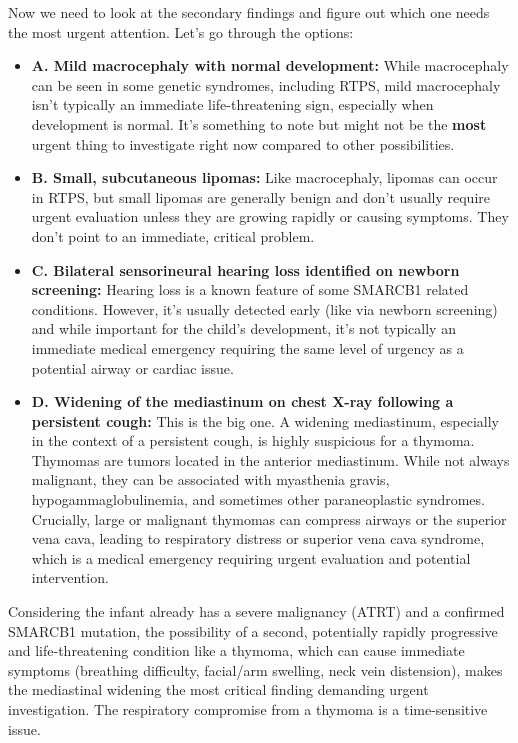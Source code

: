 \documentclass{article}
\theoremstyle{plain}
\theoremstyle{definition}
\theoremstyle{remark}
\begin{document}
\begin{tcolorbox}
\begin{tcolorbox}
        Now we need to look at the secondary findings and figure out which one needs the most urgent attention. Let's go through the options:

        \begin{itemize}[leftmargin=*, nosep]
            \item \textbf{A. Mild macrocephaly with normal development:} While macrocephaly can be seen in some genetic syndromes, including RTPS, mild macrocephaly isn't typically an immediate life-threatening sign, especially when development is normal. It's something to note but might not be the \textbf{most} urgent thing to investigate right now compared to other possibilities.
            \item \textbf{B. Small, subcutaneous lipomas:} Like macrocephaly, lipomas can occur in RTPS, but small lipomas are generally benign and don't usually require urgent evaluation unless they are growing rapidly or causing symptoms. They don't point to an immediate, critical problem.
            \item \textbf{C. Bilateral sensorineural hearing loss identified on newborn screening:} Hearing loss is a known feature of some SMARCB1 related conditions. However, it's usually detected early (like via newborn screening) and while important for the child's development, it's not typically an immediate medical emergency requiring the same level of urgency as a potential airway or cardiac issue.
            \item \textbf{D. Widening of the mediastinum on chest X-ray following a persistent cough:} This is the big one. A \colorbox{pathhighlight}{widening mediastinum,} especially in the context of a persistent cough, is highly suspicious for a \colorbox{pathhighlight}{thymoma.} Thymomas are tumors located in the anterior mediastinum. While not always malignant, they can be associated with myasthenia gravis, hypogammaglobulinemia, and sometimes other paraneoplastic syndromes. Crucially, large or malignant thymomas can compress airways or the superior vena cava, leading to respiratory distress or superior vena cava syndrome, which is a medical emergency requiring urgent evaluation and potential intervention.
        \end{itemize}

        Considering the infant already has a severe malignancy (ATRT) and a confirmed SMARCB1 mutation, the possibility of a second, potentially rapidly progressive and life-threatening condition like a thymoma, which can cause immediate symptoms (breathing difficulty, facial/arm swelling, neck vein distension), makes the \colorbox{pathhighlight}{mediastinal widening} the most critical finding demanding urgent investigation. The respiratory compromise from a thymoma is a time-sensitive issue.


\end{tcolorbox}
\end{tcolorbox}
\end{document}
